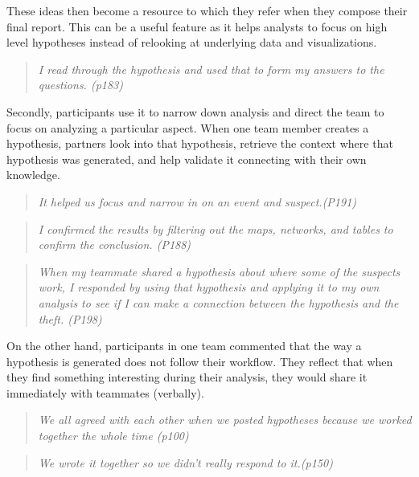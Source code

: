 These ideas then become a resource to which they refer when they compose their final report. This can be a useful feature as it helps analysts to focus on high level hypotheses instead of relooking at underlying data and visualizations. 

\begin{quote}
	\emph{I read through the hypothesis and used that to form my answers to the questions. (p183)}
\end{quote}


Secondly, participants use it to narrow down analysis and direct the team to focus on analyzing a particular aspect. When one team member creates a hypothesis, partners look into that hypothesis, retrieve the context where that hypothesis was generated, and help validate it connecting with their own knowledge. 

\begin{quote}
	\emph{It helped us focus and narrow in on an event and suspect.(P191)}
\end{quote}
\begin{quote}
	\emph{I confirmed the results by filtering out the maps, networks, and tables to confirm the conclusion. (P188)}
\end{quote}
\begin{quote}
	\emph{When my teammate shared a hypothesis about where some of the suspects work, I responded by using that hypothesis and applying it to my own analysis to see if I can make a connection between the hypothesis and the theft. (P198)}
\end{quote}


On the other hand, participants in one team commented that the way a hypothesis is generated does not follow their workflow. They reflect that when they find something interesting during their analysis, they would share it immediately with teammates (verbally). 

\begin{quote}
	\emph{We all agreed with each other when we posted hypotheses because we worked together the whole time (p100)}
\end{quote}

\begin{quote}
	\emph{We wrote it together so we didn’t really respond to it.(p150)}
\end{quote}

